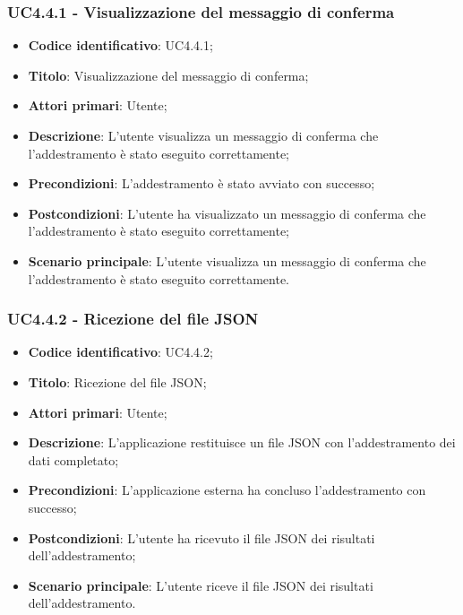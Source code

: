 \subsubsection{UC4.4.1 - Visualizzazione del messaggio di conferma}
\begin{itemize}
	\item \textbf{Codice identificativo}: UC4.4.1;
	\item \textbf{Titolo}: Visualizzazione del messaggio di conferma;
	\item \textbf{Attori primari}: Utente;
	\item \textbf{Descrizione}: L'utente visualizza un messaggio di conferma che l'addestramento è stato eseguito correttamente;
	\item \textbf{Precondizioni}: L'addestramento è stato avviato con successo;
	\item \textbf{Postcondizioni}: L'utente ha visualizzato un messaggio di conferma che l'addestramento è stato eseguito correttamente;
	\item \textbf{Scenario principale}: L'utente visualizza un messaggio di conferma che l'addestramento è stato eseguito correttamente.
\end{itemize}


\subsubsection{UC4.4.2 - Ricezione del file JSON}
\begin{itemize}
    \item \textbf{Codice identificativo}: UC4.4.2;
    \item \textbf{Titolo}: Ricezione del file JSON;
    \item \textbf{Attori primari}: Utente;
    \item \textbf{Descrizione}: L'applicazione restituisce un file JSON con l'addestramento dei dati completato;
    \item \textbf{Precondizioni}: L'applicazione esterna ha concluso l'addestramento con successo;
    \item \textbf{Postcondizioni}: L'utente ha ricevuto il file JSON dei risultati dell'addestramento;
    \item \textbf{Scenario principale}: L'utente riceve il file JSON dei risultati dell'addestramento.
\end{itemize}